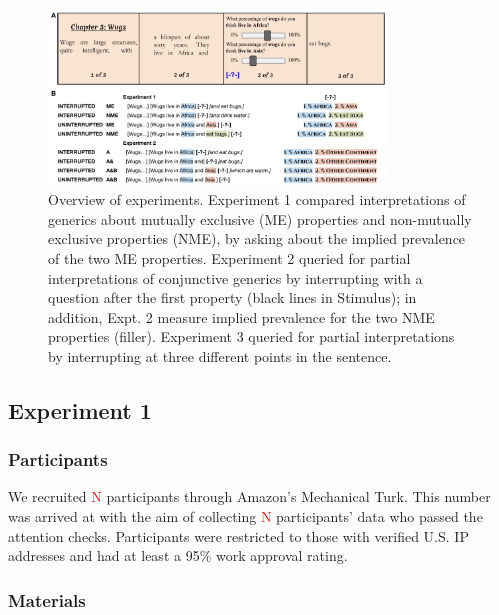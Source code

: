 \documentclass[10pt,letterpaper]{article}
\newcommand{\red}[1]{{\textcolor{Red}{#1}}}
\begin{document}
\begin{figure}[h]
  \centering
    \includegraphics[width=0.8\textwidth]{design}
  \caption{Overview of experiments. Experiment 1 compared interpretations of generics about mutually exclusive (ME) properties and non-mutually exclusive properties (NME), by asking about the implied prevalence of the two ME properties. Experiment 2 queried for partial interpretations of conjunctive generics by interrupting with a question after the first property (black lines in Stimulus); in addition, Expt. 2 measure implied prevalence for the two NME properties (filler). Experiment 3 queried for partial interpretations by interrupting at three different points in the sentence. }
  \label{fig:expt1}
\end{figure}
\subsection{Experiment 1}

\subsubsection{Participants}
We recruited \red{N} participants through Amazon's Mechanical Turk.
This number was arrived at with the aim of collecting \red{N} participants' data who passed the attention checks.  
Participants were restricted to those with verified U.S. IP addresses and had at least a 95\% work approval rating. 


\subsubsection{Materials}
\end{document}

